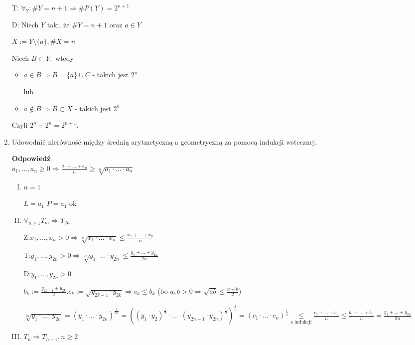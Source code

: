 \documentclass[12pt,a4paper]{article}
\theoremstyle{break}
\newcommand{\Odp}[1]{
		\begin{mdframed}[style=zadanie]
			\textbf{Odpowiedź}\\
			#1
		\end{mdframed}
	}
\begin{document}
\begin{enumerate}[1.]
{\begin{enumerate}[$1^\circ$]
				T: $\forall_Y : \#Y=n+1 \Rightarrow \#P(Y)=2^{n+1}$
				
				D: Niech $Y$ taki, że $\#Y=n+1$ oraz $a\in Y$
				
				$X:=Y\setminus \{a\}, \#X=n$
				
				Niech $B\subset Y,$ wtedy
				
				\begin{itemize}
					\item $a\in B \Rightarrow B=\{a\}\cup C$ - takich jest $2^n$
					
					lub\\
					
					\item $a\notin B \Rightarrow B\subset X$ - takich jest $2^n$
				\end{itemize}
			
			Czyli $2^n+2^n=2^{n+1}$.
		\end{enumerate}
	}
	
	\item Udowodnić nierówność między średnią arytmetyczną a geometryczną za pomocą indukcji wstecznej.
	\Odp{
		$a_1,\dots,a_n\geq 0 \Rightarrow \frac{a_1+\dots+a_n}{n}\geq \sqrt[n]{a_1\cdot \dots \cdot a_n}$
		
		\begin{enumerate}[I)]
			\item $n=1$
			
			$L=a_1$ $P=a_1$ ok
			
			\item $\forall_{n\geq 1} T_m\Rightarrow T_{2n}$
			
			Z:$x_1,\dots,x_n >0 \Rightarrow \sqrt[n]{x_1\cdot \dots \cdot x_n}\leq \frac{x_1+\dots+x_n}{n}$
			
			T:$y_1,\dots,y_{2n} >0 \Rightarrow \sqrt[2n]{y_1\cdot \dots \cdot y_{2n}}\leq \frac{y_1+\dots+y_{2n}}{2n}$
			
			D:$y_1,\dots,y_{2n}>0$
			
			$b_k:=\frac{y_{2k-1}+y_{2k}}{2}. c_k:=\sqrt{y_{2k-1}\cdot y_{2k}} \Rightarrow c_k\leq b_k$ (bo $a,b>0\Rightarrow \sqrt{ab}\leq \frac{a+b}{2}$)
			
			$\sqrt[2n]{y_1 \cdot \dots \cdot y_{2n}}=(y_1 \cdot \dots \cdot y_{2n})^\frac{1}{2n}=((y_1\cdot y_2)^\frac{1}{2}\cdot \dots \cdot (y_{2n-1}\cdot y_{2n})^\frac{1}{2})^\frac{1}{n}=(c_1\cdot \dots \cdot c_n)^\frac{1}{n}\underset{\text{z indukcji}}{\leq} \frac{c_1+\dots+c_n}{n}
			\leq \frac{b_1+\dots+b_n}{n}=\frac{y_1+\dots+y_{2n}}{2n}$
			
			\item $T_n\Rightarrow T_{n-1}, n\geq 2$
			

\end{enumerate}}
\end{enumerate}
\end{document}
